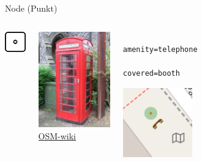 \documentclass{beamer}
\begin{document}
			\begin{frame}[fragile]{Node (Punkt)}
				\begin{center}
					\begin{columns}
						\begin{column}{1.25cm}
							\centering
							\includegraphics[width=1cm]{images/240px-Mf_node.png}
						\end{column}
						\begin{column}{3.75cm}
							\centering
							\includegraphics[width=3.5cm]{images/red-telephone-box-uk.jpg}\\
							\textcolor{gray}{
								\tiny
								\href{https://wiki.openstreetmap.org/wiki/File:Red\_telephone\_box\_-\_geograph.org.uk\_-_919348.jpg}{OSM-wiki}
							}
						\end{column}
						\begin{column}{3.5cm}
							\begin{verbatim}
								amenity=telephone
								covered=booth
							\end{verbatim}
							\begin{center}
								\includegraphics[height=3cm]{images/telephone.png}
							\end{center}
						\end{column}
					\end{columns}
				\end{center}
			\end{frame}
		
\end{document}
